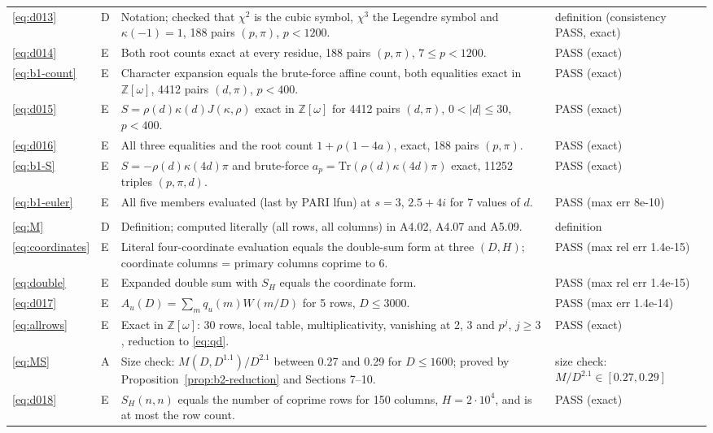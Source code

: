 \documentclass[11pt]{article}
\numberwithin{equation}{section}
\begin{document}
\begin{longtable}{@{}>{\raggedright\arraybackslash}p{1.2cm}>{\centering\arraybackslash}p{0.7cm}>{\raggedright\arraybackslash}p{9.05cm}>{\raggedright\arraybackslash}p{4.3cm}@{}}
\eqref{eq:d013} & D & Notation; checked that $\chi^2$ is the cubic symbol, $\chi^3$ the Legendre symbol and $\kappa(-1)=1$, 188 pairs $(p,\pi)$, $p<1200$. & definition (consistency PASS, exact)\\
\eqref{eq:d014} & E & Both root counts exact at every residue, 188 pairs $(p,\pi)$, $7\le p<1200$. & PASS (exact)\\
\eqref{eq:b1-count} & E & Character expansion equals the brute-force affine count, both equalities exact in $\mathbb Z[\omega]$, 4412 pairs $(d,\pi)$, $p<400$. & PASS (exact)\\
\eqref{eq:d015} & E & $S=\rho(d)\kappa(d)J(\kappa,\rho)$ exact in $\mathbb Z[\omega]$ for 4412 pairs $(d,\pi)$, $0<|d|\le30$, $p<400$. & PASS (exact)\\
\eqref{eq:d016} & E & All three equalities and the root count $1+\rho(1-4a)$, exact, 188 pairs $(p,\pi)$. & PASS (exact)\\
\eqref{eq:b1-S} & E & $S=-\rho(d)\kappa(4d)\pi$ and brute-force $a_p=\mathrm{Tr}(\rho(d)\kappa(4d)\pi)$ exact, 11252 triples $(p,\pi,d)$. & PASS (exact)\\
\eqref{eq:b1-euler} & E & All five members evaluated (last by PARI lfun) at $s=3$, $2.5+4i$ for 7 values of $d$. & PASS (max err 8e-10)\\
\multicolumn{4}{@{}l}{\emph{Section~4}}\\
\eqref{eq:M} & D & Definition; computed literally (all rows, all columns) in A4.02, A4.07 and A5.09. & definition\\
\eqref{eq:coordinates} & E & Literal four-coordinate evaluation equals the double-sum form at three $(D,H)$; coordinate columns = primary columns coprime to 6. & PASS (max rel err 1.4e-15)\\
\eqref{eq:double} & E & Expanded double sum with $S_H$ equals the coordinate form. & PASS (max rel err 1.4e-15)\\
\eqref{eq:d017} & E & $A_u(D)=\sum_mq_u(m)W(m/D)$ for 5 rows, $D\le3000$. & PASS (max err 1.4e-14)\\
\eqref{eq:allrows} & E & Exact in $\mathbb Z[\omega]$: 30 rows, local table, multiplicativity, vanishing at 2, 3 and $p^j$, $j\ge3$, reduction to \eqref{eq:qd}. & PASS (exact)\\
\eqref{eq:MS} & A & Size check: $M(D,D^{1.1})/D^{2.1}$ between 0.27 and 0.29 for $D\le1600$; proved by Proposition~\ref{prop:b2-reduction} and Sections 7--10. & size check: $M/D^{2.1}\in[0.27,0.29]$\\
\eqref{eq:d018} & E & $S_H(n,n)$ equals the number of coprime rows for 150 columns, $H=2\cdot10^4$, and is at most the row count. & PASS (exact)\\

\end{longtable}
\end{document}
